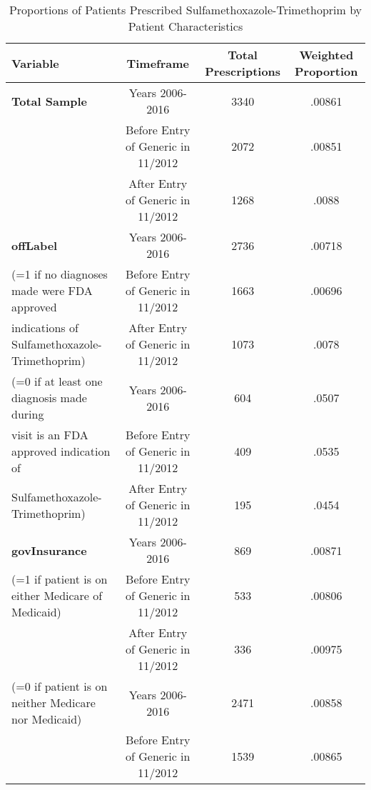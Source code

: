 \begin{table}[htbp]\centering
\def\sym#1{\ifmmode^{#1}\else\(^{#1}\)\fi}
\caption{Proportions of Patients Prescribed Sulfamethoxazole-Trimethoprim by Patient Characteristics\label{tab1}}
\begin{tabular}{l*{3}{c}}
\hline\hline
            Variable&\multicolumn{1}{c}{Timeframe}&\multicolumn{1}{c}{Total Prescriptions}&\multicolumn{1}{c}{Weighted Proportion}\\
\hline
\textbf{Total Sample}                                   &     Years 2006-2016&                          3340&     .00861\\
                                                        &     Before Entry of Generic in 11/2012&    2072&     .00851\\
                                                        &     After Entry of Generic in 11/2012&      1268&     .0088\\
[1em]
\textbf{offLabel}                                       &     Years 2006-2016&             2736&     .00718\\
(=1 if no diagnoses made were FDA approved         &     Before Entry of Generic in 11/2012&    1663&     .00696\\
indications of Sulfamethoxazole-Trimethoprim)  &     After Entry of Generic in 11/2012&      1073&     .0078\\
[1em]
(=0 if at least one diagnosis made during               &     Years 2006-2016&             604&     .0507\\
visit is an FDA approved indication of                  &     Before Entry of Generic in 11/2012&    409&     .0535\\
Sulfamethoxazole-Trimethoprim)                          &     After Entry of Generic in 11/2012&      195&     .0454\\
[1em]
\textbf{govInsurance}                                   &     Years 2006-2016&             869&     .00871\\
(=1 if patient is on either Medicare of Medicaid)       &     Before Entry of Generic in 11/2012&     533 &     .00806\\
                                                        &     After Entry of Generic in 11/2012&      336 &     .00975\\
[1em]
(=0 if patient is on neither Medicare nor Medicaid)     &     Years 2006-2016&             2471&     .00858\\
                                                        &     Before Entry of Generic in 11/2012&     1539 &     .00865\\

\end{tabular}
\end{table}
